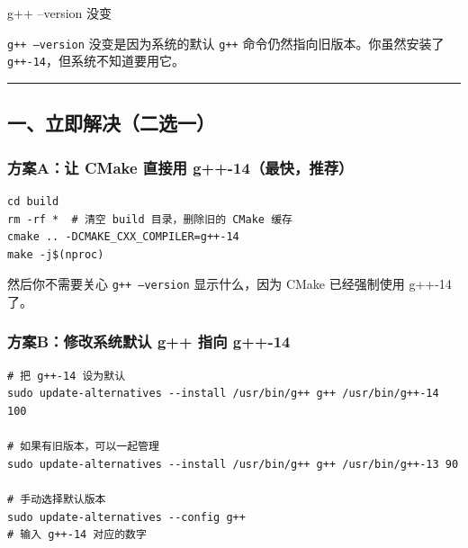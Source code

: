 \documentclass[11pt, a4paper]{article}
\begin{document}
\vspace{1.5em}

\begin{userbox}
g++ --version 没变
\end{userbox}

\begin{aibox}
\texttt{g++ --version} 没变是因为系统的默认 \texttt{g++} 命令仍然指向旧版本。你虽然安装了 \texttt{g++-14}，但系统不知道要用它。

\begin{center}\rule{\textwidth}{0.4pt}\end{center}

\subsection*{一、立即解决（二选一）}

\subsubsection*{方案A：让 CMake 直接用 g++-14（最快，推荐）}

\begin{tcolorbox}[colback=white,colframe=gray!50!white,boxrule=0.5pt,arc=2pt,left=5pt,right=5pt,top=5pt,bottom=5pt]
\begin{verbatim}
cd build
rm -rf *  # 清空 build 目录，删除旧的 CMake 缓存
cmake .. -DCMAKE_CXX_COMPILER=g++-14
make -j$(nproc)
\end{verbatim}
\end{tcolorbox}

然后你不需要关心 \texttt{g++ --version} 显示什么，因为 CMake 已经强制使用 g++-14 了。

\subsubsection*{方案B：修改系统默认 g++ 指向 g++-14}

\begin{tcolorbox}[colback=white,colframe=gray!50!white,boxrule=0.5pt,arc=2pt,left=5pt,right=5pt,top=5pt,bottom=5pt]
\begin{verbatim}
# 把 g++-14 设为默认
sudo update-alternatives --install /usr/bin/g++ g++ /usr/bin/g++-14 100

# 如果有旧版本，可以一起管理
sudo update-alternatives --install /usr/bin/g++ g++ /usr/bin/g++-13 90

# 手动选择默认版本
sudo update-alternatives --config g++
# 输入 g++-14 对应的数字


\end{verbatim}
\end{tcolorbox}
\end{aibox}
\end{document}
